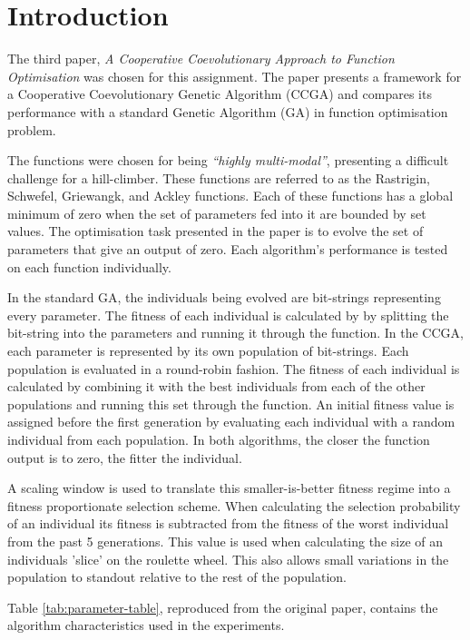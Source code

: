 \section{Introduction} \label{sec:introduction}

The third paper, \textit{A Cooperative Coevolutionary Approach to Function Optimisation}\cite{original-paper} was chosen for this assignment.
The paper presents a framework for a Cooperative Coevolutionary Genetic Algorithm (CCGA) and compares its performance with a standard Genetic Algorithm (GA) in function optimisation problem.

The functions were chosen for being \textit{``highly multi-modal''}, presenting a difficult challenge for a hill-climber.
These functions are referred to as the Rastrigin, Schwefel, Griewangk, and Ackley functions\cite{functions-1,functions-2,functions-3}.
Each of these functions has a global minimum of zero when the set of parameters fed into it are bounded by set values.
The optimisation task presented in the paper is to evolve the set of parameters that give an output of zero.
Each algorithm's performance is tested on each function individually.

In the standard GA, the individuals being evolved are bit-strings representing every parameter.
The fitness of each individual is calculated by by splitting the bit-string into the parameters and running it through the function.
In the CCGA, each parameter is represented by its own population of bit-strings.
Each population is evaluated in a round-robin fashion.
The fitness of each individual is calculated by combining it with the best individuals from each of the other populations and running this set through the function.
An initial fitness value is assigned before the first generation by evaluating each individual with a random individual from each population.
In both algorithms, the closer the function output is to zero, the fitter the individual.

A scaling window is used to translate this smaller-is-better fitness regime into a fitness proportionate selection scheme.
When calculating the selection probability of an individual its fitness is subtracted from the fitness of the worst individual from the past 5 generations.
This value is used when calculating the size of an individuals 'slice' on the roulette wheel.
This also allows small variations in the population to standout relative to the rest of the population.

Table \ref{tab:parameter-table}, reproduced from the original paper, contains the algorithm characteristics used in the experiments.


